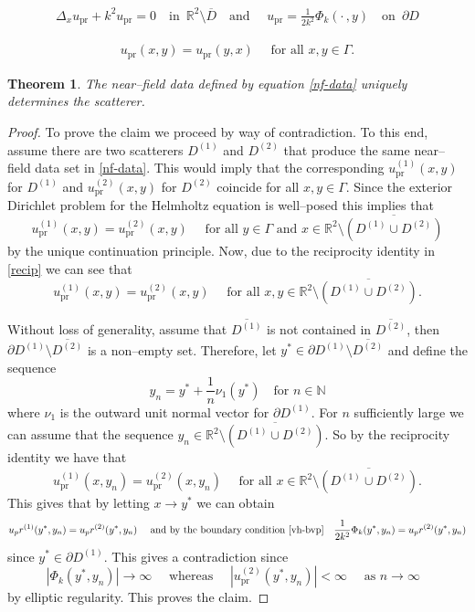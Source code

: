 \documentclass[10pt,a4paper]{amsart}
\newtheorem{theorem}{Theorem}
\newcommand{\N}{\mathbb{N}}
\newcommand{\R}{\mathbb{R}}
\newcommand{\exD}{\mathbb{R}^2 \setminus \overline{D}}
\begin{document}
\begin{align} \label{vh-bvp} 
\Delta_x u_\textrm{pr} + k^2 u_\textrm{pr} = 0 \quad \text{in } \,  \exD \quad \text{and } \quad u_\textrm{pr} = \frac{1}{2k^2} \Phi_k ( \cdot \, , y)  \quad \text{on } \,  \partial D
\end{align}

\begin{align}\label{recip}
u_\textrm{pr}(x,y) =  u_\textrm{pr}(y,x) \quad \text{ for all $x,y \in \Gamma$}. 
\end{align}

\begin{theorem} \label{ip-uniqueness}
The near--field data defined by equation \eqref{nf-data} uniquely determines the scatterer. 
\end{theorem}

\begin{proof}
To prove the claim we proceed by way of contradiction. To this end, assume there are two scatterers $D^{(1)}$ and $D^{(2)}$ that produce the same near--field data set in \eqref{nf-data}. This would imply that the corresponding $u_\textrm{pr}^{(1)} ( x , y )$ for $D^{(1)}$ and $u_\textrm{pr}^{(2)} ( x , y )$ for $D^{(2)}$ coincide for all $x,y \in \Gamma$. Since the exterior Dirichlet problem for the Helmholtz equation is well--posed this implies that 
$$u_\textrm{pr}^{(1)} ( x , y ) = u_\textrm{pr}^{(2)} ( x , y ) \quad \text{ for all $y\in \Gamma$ and $x \in \R^2 \setminus \overline{(D^{(1)} \cup D^{(2)})}$}$$
by the unique continuation principle. Now, due to the reciprocity identity in \eqref{recip} we can see that 
$$u_\textrm{pr}^{(1)} ( x , y ) = u_\textrm{pr}^{(2)} ( x , y ) \quad \text{ for all $x,y \in \R^2 \setminus \overline{(D^{(1)} \cup D^{(2)})}$}.$$

Without loss of generality, assume that $\overline{D^{(1)}}$ is not contained in $\overline{D^{(2)}}$, then $\partial D^{(1)} \setminus \overline{D^{(2)}}$ is a non--empty set. Therefore, let $y^* \in \partial D^{(1)} \setminus \overline{D^{(2)}}$ and define the sequence 
$$y_n = y^* + \frac{1}{n} \nu_1(y^*)  \quad \text{for $n \in \N$} $$ 
where $\nu_1$ is the outward unit normal vector for $\partial D^{(1)}$. For $n$ sufficiently large we can assume that the sequence $y_n \in \R^2 \setminus \overline{(D^{(1)} \cup D^{(2)})}$. So by the reciprocity identity we have that
$$u_\textrm{pr}^{(1)} ( x , y_n ) = u_\textrm{pr}^{(2)} ( x , y_n ) \quad \text{ for all $x \in \R^2 \setminus \overline{(D^{(1)} \cup D^{(2)})}$}.$$
This gives that by letting $x \to y^*$ we can obtain
$$ u_\textrm{pr}^{(1)} ( y^* , y_n ) = u_\textrm{pr}^{(2)} ( y^* , y_n )  \quad \text{ and by the boundary condition \eqref{vh-bvp}} \quad \frac{1}{2k^2} \Phi_k ( y^* , y_n ) = u_\textrm{pr}^{(2)} ( y^* , y_n )$$
since $y^* \in \partial D^{(1)}$. This gives a contradiction since 
$$ |\Phi_k ( y^* , y_n )| \to \infty  \quad \text{ whereas } \quad |u_\textrm{pr}^{(2)} ( y^* , y_n )| < \infty  \quad \text{ as $n \to \infty$ }$$
by elliptic regularity. This proves the claim. 
\end{proof}
\end{document}
